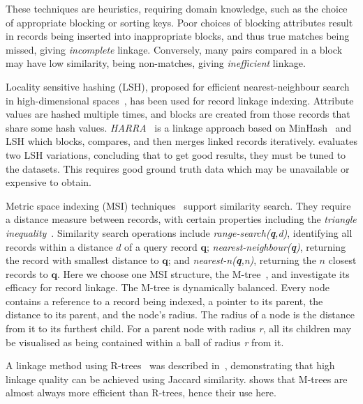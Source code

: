 \documentclass{llncs}
\begin{document}
These techniques are heuristics, requiring domain knowledge, such as the
choice of appropriate blocking or sorting keys. Poor choices of blocking
attributes result in records being inserted into inappropriate blocks,
and thus true matches being missed, giving \emph{incomplete} linkage.
Conversely, many pairs compared in a block may have low similarity,
being non-matches, giving \emph{inefficient} linkage.

Locality sensitive hashing (LSH), proposed for efficient
nearest-neighbour search in high-dimensional spaces~\cite{Ind98}, has
been used for record linkage indexing. Attribute values are hashed
multiple times, and blocks are created from those records that share
some hash values. \emph{HARRA}~\cite{Kim10} is a linkage approach based
on MinHash~\cite{Broder1997} and LSH which blocks, compares, and then
merges linked records iteratively. \cite{Steorts2014} evaluates two LSH
variations, concluding that to get good results, they must be tuned to
the datasets. This requires good ground truth data which may be
unavailable or expensive to obtain.

Metric space indexing (MSI) techniques~\cite{Zezula2010} support
similarity search. They require a distance measure between records, with
certain properties including the \emph{triangle
inequality}~\cite{Zezula2010}. Similarity search operations include
\emph{range-search(\textbf{q},d)}, identifying all records within a
distance $d$ of a query record $\mathbf{q}$;
\emph{nearest-neighbour(\textbf{q})}, returning the record with smallest
distance to $\mathbf{q}$; and \emph{nearest-n(\textbf{q},n)}, returning
the $n$ closest records to $\mathbf{q}$. Here we choose one MSI
structure, the M-tree~\cite{Ciaccia97indexingmetric}, and investigate
its efficacy for record linkage. The M-tree is dynamically balanced.
Every node contains a reference to a record being indexed, a pointer to
its parent, the distance to its parent, and the node's radius. The
radius of a node is the distance from it to its furthest child. For a
parent node with radius \textit{r}, all its children may be visualised
as being contained within a ball of radius \textit{r} from it.

A linkage method using R-trees~\cite{Hjaltason1998} was described
in~\cite{Li2006}, demonstrating that high linkage quality can be
achieved using Jaccard similarity. \cite{Ciaccia97indexingmetric} shows
that M-trees are almost always more efficient than R-trees, hence their
use here.

\end{document}

